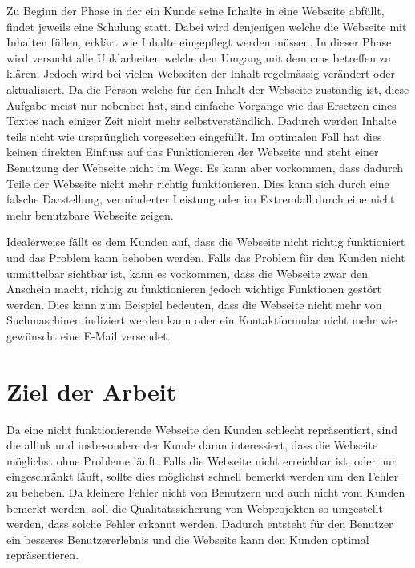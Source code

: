 Zu Beginn der Phase in der ein Kunde seine Inhalte in eine Webseite abfüllt, findet jeweils eine Schulung statt. Dabei wird denjenigen welche die Webseite mit Inhalten füllen, erklärt wie Inhalte eingepflegt werden müssen. In dieser Phase wird versucht alle Unklarheiten welche den Umgang mit dem \acrshort{cms} betreffen zu klären. Jedoch wird bei vielen Webseiten der Inhalt regelmässig verändert oder aktualisiert. Da die Person welche für den Inhalt der Webseite zuständig ist, diese Aufgabe meist nur nebenbei hat, sind einfache Vorgänge wie das Ersetzen eines Textes nach einiger Zeit nicht mehr selbstverständlich. Dadurch werden Inhalte teils nicht wie ursprünglich vorgesehen eingefüllt. Im optimalen Fall hat dies keinen direkten Einfluss auf das Funktionieren der Webseite und steht einer Benutzung der Webseite nicht im Wege. Es kann aber vorkommen, dass dadurch Teile der Webseite nicht mehr richtig funktionieren. Dies kann sich durch eine falsche Darstellung, verminderter Leistung oder im Extremfall durch eine nicht mehr benutzbare Webseite zeigen.

Idealerweise fällt es dem Kunden auf, dass die Webseite nicht richtig funktioniert und das Problem kann behoben werden. Falls das Problem für den Kunden nicht unmittelbar sichtbar ist, kann es vorkommen, dass die Webseite zwar den Anschein macht, richtig zu funktionieren jedoch wichtige Funktionen gestört werden. Dies kann zum Beispiel bedeuten, dass die Webseite nicht mehr von Suchmaschinen indiziert werden kann oder ein Kontaktformular nicht mehr wie gewünscht eine E-Mail versendet.

\section{Ziel der Arbeit}
\label{sec:ziel_der_arbeit}
Da eine nicht funktionierende Webseite den Kunden schlecht repräsentiert, sind die allink und insbesondere der Kunde daran interessiert, dass die Webseite möglichst ohne Probleme läuft. Falls die Webseite nicht erreichbar ist, oder nur eingeschränkt läuft, sollte dies möglichst schnell bemerkt werden um den Fehler zu beheben. Da kleinere Fehler nicht von Benutzern und auch nicht vom Kunden bemerkt werden, soll die Qualitätssicherung von Webprojekten so umgestellt werden, dass solche Fehler erkannt werden. Dadurch entsteht für den Benutzer ein besseres Benutzererlebnis und die Webseite kann den Kunden optimal repräsentieren.

